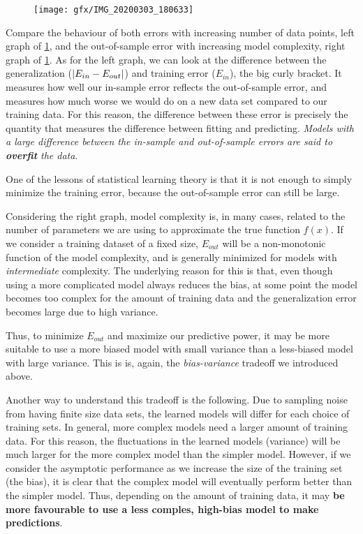 \begin{figure}[h!]
	\centering
	\texttt{[image: gfx/IMG\_20200303\_180633]}
	\caption{}
	\label{fig:errorbehaviour}
\end{figure}
Compare the behaviour of both errors with increasing number of data points, left graph of \ref{fig:errorbehaviour}, and the out-of-sample error with increasing model complexity, right graph of \ref{fig:errorbehaviour}. As for the left graph, we can look at the difference between the generalization ($\abs{E_{in}-E_{out}}$) and training error ($E_{in}$), the big curly bracket. It measures how well our in-sample error reflects the out-of-sample error, and measures how much worse we would do on a new data set compared to our training data. For this reason, the difference between these error is precisely the quantity that measures the difference between fitting and predicting. \emph{Models with a large difference between the in-sample and out-of-sample errors are said to \textbf{overfit} the data}. 
\begin{mybox}{}
	One of the lessons of statistical learning theory is that it is not enough to simply minimize the training error, because the out-of-sample error can still be large.
\end{mybox}
Considering the right graph, model  complexity is, in many cases, related to the number of parameters we are using to approximate the true function $f(x)$. If we consider a training dataset of a fixed size, $E_{out}$ will be a non-monotonic function of the model complexity, and is generally minimized for models with \emph{intermediate} complexity. The underlying reason for this is that, even though using a more complicated model always reduces the bias, at some point the model becomes too complex for the amount of training data and the generalization error becomes large due to high variance.
\begin{mybox}{}
Thus, to minimize $E_{out}$ and maximize our predictive power, it may be more suitable to use a more biased model with small variance than a less-biased model with large variance. This is is, again, the \emph{bias-variance} tradeoff we introduced above.
\end{mybox} 
Another way to understand this tradeoff is the following. Due to sampling noise from having finite size data sets, the learned models will differ for each choice of training sets. In general, more complex models need a larger amount of training data. For this reason, the fluctuations in the learned models (variance) will be much larger for the more complex model than the simpler model. However, if we consider the asymptotic performance as we increase the size of the training set (the bias), it is clear that the complex model will eventually perform better than the simpler model. Thus, depending on the amount of training data, it may \textbf{be more favourable to use a less comples, high-bias model to make predictions}.
